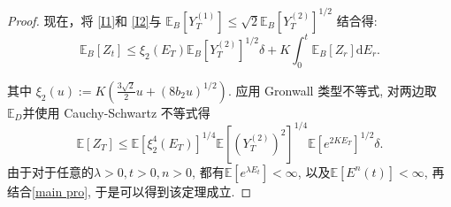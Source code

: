 \begin{proof}
	现在，将 \cref{I1}和 \cref{I2}与  $\mathbb{E}_B[Y_T^{(1)}]\leq\sqrt{2}\mathbb{E}_B[Y_T^{(2)}]^{1/2}$ 结合得:
	\begin{equation*}
			\mathbb{E}_B[Z_t] 
		\leq \xi_2(E_T)\mathbb{E}_B[Y_T^{(2)}]^{1/2}\delta + K\int_0^t\mathbb{E}_B[Z_r] \mathrm{d}E_r.
	\end{equation*}

	其中 $\xi_2(u) := K(\frac{3\sqrt{2}}{2}u + (8b_2u)^{1/2}).$
	应用 Gronwall 类型不等式, 对两边取 $ \mathbb{E}_D $并使用 Cauchy-Schwartz 不等式得 
	\begin{equation*}
			\mathbb{E}[Z_T] \leq \mathbb{E}[\xi_2^4(E_T)]^{1/4}\mathbb{E}[(Y_T^{(2)})^2]^{1/4}\mathbb{E}[e^{2KE_T}]^{1/2}\delta.
	\end{equation*}
	由于对于任意的$\lambda>0, t>0,n>0$, 都有$\mathbb{E}[e^{\lambda E_t}] < \infty$, 以及$\mathbb{E}[E^n(t)] < \infty$, 再结合\cref{main pro}, 于是可以得到该定理成立.
	

	
	
	
\end{proof}


